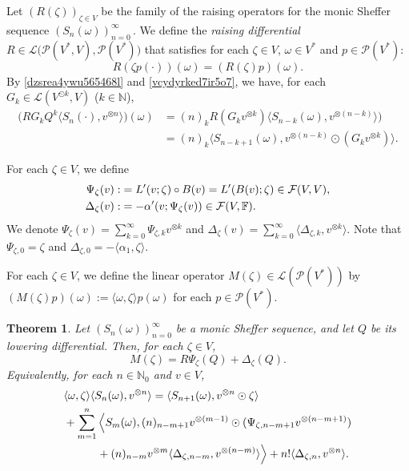 \documentclass[12pt]{article}
\newtheorem{theorem}{Theorem}[section]
\theoremstyle{remark}
\theoremstyle{remark}
\theoremstyle{remark}
\begin{document}
 
 Let $(R(\zeta))_{\zeta\in V}$ be the family of the raising operators for the monic Sheffer sequence $(S_n(\omega))_{n=0}^\infty$\,. We define the {\it raising differential} $R\in\mathcal L\big(\mathcal P(V^*,V),\mathcal P(V^*)\big)$ that satisfies for each $\zeta\in V$, $\omega\in V^*$ and $p\in\mathcal P(V^*)$:
\begin{equation}\label{vcydyrked7ir5o7}
R(\zeta p(\cdot))(\omega)=(R(\zeta)p)(\omega).\end{equation}
By \eqref{dzsrea4ywu565468l} and \eqref{vcydyrked7ir5o7}, we have, for each $G_k\in\mathcal L(V^{\odot k},V)$ ($k\in\mathbb N$), 
 \begin{align*}
 \big(RG_kQ^k\langle S_n(\cdot),v^{\otimes n}\rangle\big)(\omega)&=(n)_kR(G_kv^{\otimes k})\langle S_{n-k}(\omega),v^{\otimes(n-k)}\rangle\big)\\
  &=(n)_k\langle S_{n-k+1}(\omega),v^{\otimes(n-k)}\odot(G_kv^{\otimes k})\rangle.
  \end{align*}

 
 For each $\zeta\in V$, we define
\begin{align}
\Psi_\zeta(v):&=L'(v;\zeta)\circ B(v)=L'(B(v);\zeta)\in\mathcal F(V,V),\notag\\
\Delta_\zeta(v):&=-\alpha'(v;\Psi_\zeta(v))\in\mathcal F(V,\mathbb F). 
\label{gfr6e54w38ffdrd}\end{align}
 We denote $\Psi_\zeta(v)=\sum_{k=0}^\infty \Psi_{\zeta,k}v^{\otimes k}$ and  $\Delta_\zeta(v)=\sum_{k=0}^\infty\langle \Delta_{\zeta,k},v^{\otimes k}\rangle$. Note that $\Psi_{\zeta,0}=\zeta$ and $\Delta_{\zeta,0}=-\langle\alpha_1,\zeta\rangle$.

For each $\zeta\in V$, we define the linear operator $M(\zeta)\in\mathcal L(\mathcal P(V^*))$ by $(M(\zeta)p)(\omega):=\langle\omega,\zeta\rangle p(\omega)$ for each $p\in\mathcal P(V^*)$. 

 
 \begin{theorem}\label{xts5yw5yww45uwe} Let $(S_n(\omega))_{n=0}^\infty$ be a monic Sheffer sequence, and let $Q$ be its lowering differential. 
  Then, for each $\zeta\in V$,
 \begin{equation}\label{xresraqw5ywu5}
 M(\zeta)=R \Psi_\zeta(Q)+\Delta_\zeta(Q).
 \end{equation}
 Equivalently, for each $n\in\mathbb N_0$ and $v\in V$,
 \begin{align}
 &\langle\omega,\zeta\rangle\langle S_n(\omega),v^{\otimes n}\rangle=\langle S_{n+1}(\omega),v^{\otimes n}\odot\zeta\rangle\notag\\
&
 +\sum_{m=1}^{n}\Big\langle S_m(\omega), (n)_{n-m+1}v^{\otimes(m-1)}\odot (\Psi_{\zeta,n-m+1}v^{\otimes(n-m+1)})\notag\\
 &\qquad\quad+(n)_{n-m}v^{\otimes m}\langle\Delta_{\zeta,n-m},v^{\otimes(n-m)}\rangle\Big\rangle+n!\langle\Delta_{\zeta,n},v^{\otimes n}\rangle.\label{cxesa5yw7ypui8uytr}
 \end{align}
 \end{theorem}
\end{document}
